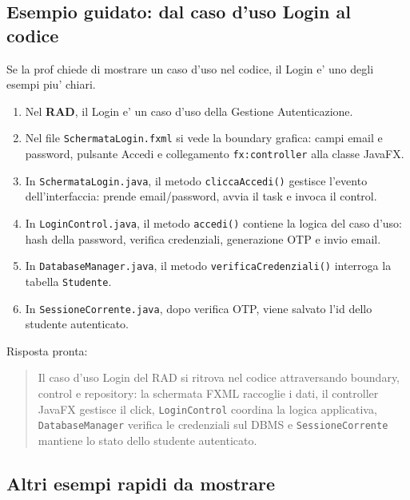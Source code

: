 ﻿\documentclass[11pt,a4paper]{article}
\newcommand{\doc}[1]{\textbf{#1}}
\begin{document}
\subsection{Esempio guidato: dal caso d'uso Login al codice}

Se la prof chiede di mostrare un caso d'uso nel codice, il Login e' uno degli esempi piu'
chiari.

\begin{enumerate}
  \item Nel \doc{RAD}, il Login e' un caso d'uso della Gestione Autenticazione.
  \item Nel file \texttt{SchermataLogin.fxml} si vede la boundary grafica: campi email e
  password, pulsante Accedi e collegamento \texttt{fx:controller} alla classe JavaFX.
  \item In \texttt{SchermataLogin.java}, il metodo \texttt{cliccaAccedi()} gestisce l'evento
  dell'interfaccia: prende email/password, avvia il task e invoca il control.
  \item In \texttt{LoginControl.java}, il metodo \texttt{accedi()} contiene la logica del
  caso d'uso: hash della password, verifica credenziali, generazione OTP e invio email.
  \item In \texttt{DatabaseManager.java}, il metodo \texttt{verificaCredenziali()} interroga
  la tabella \texttt{Studente}.
  \item In \texttt{SessioneCorrente.java}, dopo verifica OTP, viene salvato l'id dello
  studente autenticato.
\end{enumerate}

Risposta pronta:
\begin{quote}
Il caso d'uso Login del RAD si ritrova nel codice attraversando boundary, control e
repository: la schermata FXML raccoglie i dati, il controller JavaFX gestisce il click,
\texttt{LoginControl} coordina la logica applicativa, \texttt{DatabaseManager} verifica le
credenziali sul DBMS e \texttt{SessioneCorrente} mantiene lo stato dello studente
autenticato.
\end{quote}

\subsection{Altri esempi rapidi da mostrare}
\end{document}
